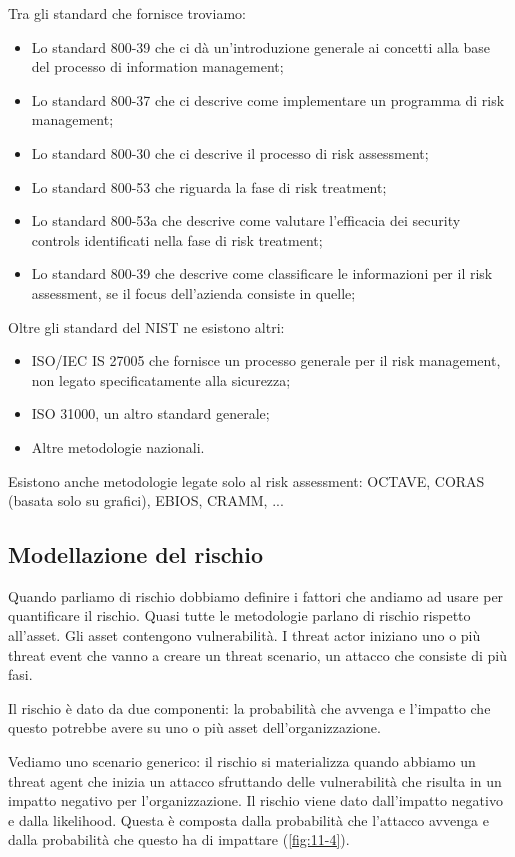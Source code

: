 \noindent Tra gli standard che fornisce troviamo:
\begin{itemize}
    \item Lo standard 800-39 che ci dà un'introduzione generale ai concetti alla base del processo di information management;
    \item Lo standard 800-37 che ci descrive come implementare un programma di risk management;
    \item Lo standard 800-30 che ci descrive il processo di risk assessment;
    \item Lo standard 800-53 che riguarda la fase di risk treatment;
    \item Lo standard 800-53a che descrive come valutare l'efficacia dei security controls identificati nella fase di risk treatment;
    \item Lo standard 800-39 che descrive come classificare le informazioni per il risk assessment, se il focus dell'azienda consiste in quelle;
\end{itemize}

\noindent Oltre gli standard del NIST ne esistono altri:
\begin{itemize}
    \item ISO/IEC IS 27005 che fornisce un processo generale per il risk management, non legato specificatamente alla sicurezza;
    \item ISO 31000, un altro standard generale;
    \item Altre metodologie nazionali.
\end{itemize}

\noindent Esistono anche metodologie legate solo al risk assessment: OCTAVE, CORAS (basata solo su grafici),  EBIOS, CRAMM, ...

\subsection{Modellazione del rischio}
Quando parliamo di rischio dobbiamo definire i fattori che andiamo ad usare per quantificare il rischio. Quasi tutte le metodologie parlano di rischio rispetto all'asset. Gli asset contengono vulnerabilità. I threat actor iniziano uno o più threat event che vanno a creare un threat scenario, un attacco che consiste di più fasi. 

Il rischio è dato da due componenti: la probabilità che avvenga e l'impatto che questo potrebbe avere su uno o più asset dell'organizzazione. 

Vediamo uno scenario generico: il rischio si materializza quando abbiamo un threat agent che inizia un attacco sfruttando delle vulnerabilità che risulta in un impatto negativo per l'organizzazione. Il rischio viene dato dall'impatto negativo e dalla likelihood. Questa è composta dalla probabilità che l'attacco avvenga e dalla probabilità che questo ha di impattare (\ref{fig:11-4}). 

